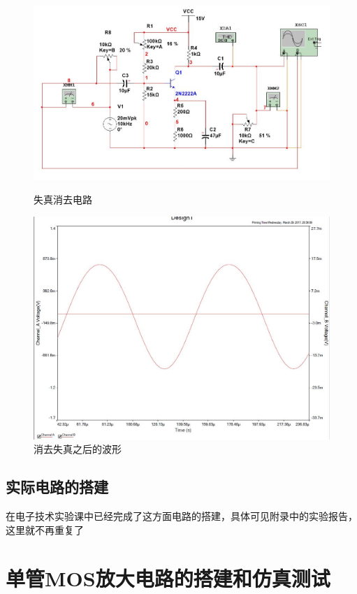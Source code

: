 \documentclass[UTF8,a4paper]{ctexart}
\begin{document}
\begin{figure}
\centering
\includegraphics[width=\textwidth]{1-43mA1k.jpg}
\caption{失真消去电路}
\label{dist1}
\includegraphics[width=\textwidth]{1-41.jpg}
\caption{消去失真之后的波形}
\label{Adist1} 
\end{figure}
\subsection{实际电路的搭建}
在电子技术实验课中已经完成了这方面电路的搭建，具体可见附录中的实验报告，这里就不再重复了
\clearpage
\section{单管MOS放大电路的搭建和仿真测试}
\end{document}
